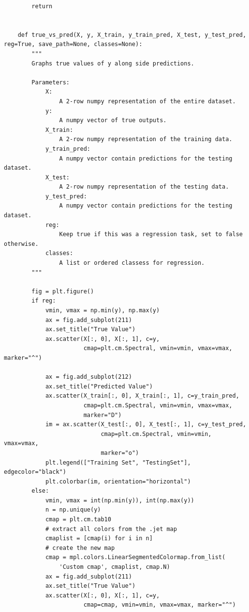 \documentclass{article}
\begin{document}
\begin{verbatim}
        return
    
    
    def true_vs_pred(X, y, X_train, y_train_pred, X_test, y_test_pred, reg=True, save_path=None, classes=None):
        """
        Graphs true values of y along side predictions.
    
        Parameters:
            X:
                A 2-row numpy representation of the entire dataset.
            y:
                A numpy vector of true outputs.
            X_train:
                A 2-row numpy representation of the training data.
            y_train_pred:
                A numpy vector contain predictions for the testing dataset.
            X_test:
                A 2-row numpy representation of the testing data.
            y_test_pred:
                A numpy vector contain predictions for the testing dataset.
            reg:
                Keep true if this was a regression task, set to false otherwise.
            classes:
                A list or ordered classess for regression.
        """
    
        fig = plt.figure()
        if reg:
            vmin, vmax = np.min(y), np.max(y)
            ax = fig.add_subplot(211)
            ax.set_title("True Value")
            ax.scatter(X[:, 0], X[:, 1], c=y,
                       cmap=plt.cm.Spectral, vmin=vmin, vmax=vmax, marker="^")
    
            ax = fig.add_subplot(212)
            ax.set_title("Predicted Value")
            ax.scatter(X_train[:, 0], X_train[:, 1], c=y_train_pred,
                       cmap=plt.cm.Spectral, vmin=vmin, vmax=vmax,
                       marker="D")
            im = ax.scatter(X_test[:, 0], X_test[:, 1], c=y_test_pred,
                            cmap=plt.cm.Spectral, vmin=vmin, vmax=vmax,
                            marker="o")
            plt.legend(["Training Set", "TestingSet"], edgecolor="black")
            plt.colorbar(im, orientation="horizontal")
        else:
            vmin, vmax = int(np.min(y)), int(np.max(y))
            n = np.unique(y)
            cmap = plt.cm.tab10
            # extract all colors from the .jet map
            cmaplist = [cmap(i) for i in n]
            # create the new map
            cmap = mpl.colors.LinearSegmentedColormap.from_list(
                'Custom cmap', cmaplist, cmap.N)
            ax = fig.add_subplot(211)
            ax.set_title("True Value")
            ax.scatter(X[:, 0], X[:, 1], c=y,
                       cmap=cmap, vmin=vmin, vmax=vmax, marker="^")
    

\end{verbatim}
\end{document}
